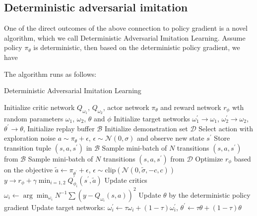 \subsection{Deterministic adversarial imitation}
One of the direct outcomes of the above connection to policy gradient is a novel algorithm, which we call Deterministic Adversarial Imitation Learning. 
Assume policy $\pi_{\theta}$ is deterministic, then based on the deterministic policy gradient, we have

The algorithm runs as follows:

\begin{algorithm}
\caption{Deterministic Adversarial Imitation Learning}
\begin{algorithmic}[1] %
\STATE Initialize critic network $Q_{\omega_1}$, $Q_{\omega_2}$, actor network $\pi_{\theta}$ and reward network $r_{\phi}$ wth random parameters $\omega_1$, $\omega_2$, $\theta$ and $\phi$
\STATE Initialize target networks $\omega_1^\prime\rightarrow\omega_1$, $\omega_2^\prime\rightarrow\omega_2$, $\theta^\prime\rightarrow\theta$,
\STATE Initialize replay buffer $\mathcal{B}$
\STATE Initialize demonstration set $\mathcal{D}$
\STATE Select action with exploration noise $a\sim\pi_{\theta} + \epsilon$, $\epsilon\sim \mathcal{N}(0, \sigma)$ and observe new state $s^\prime$
\STATE Store transition tuple $(s, a, s^\prime)$ in $\mathcal{B}$
\STATE Sample mini-batch of $N$ transitions $(s, a, s^\prime)$ from $\mathcal{B}$
\STATE Sample mini-batch of $N$ transitions $(s, a, s^\prime)$ from $\mathcal{D}$
\STATE Optimize $r_{\phi}$ based on the objective
\ENDIF
\STATE $\tilde{a} \leftarrow \pi_{\theta^\prime}+\epsilon$, $\epsilon\sim \text{clip}(\mathcal{N}(0, \tilde{\sigma}, -c, c))$
\STATE $y\rightarrow r_{\phi}+\gamma \min_{i=1, 2}Q_{\phi_i}^\prime(s^\prime, \tilde{a})$
\STATE Update critics $\omega_i\leftarrow \arg\min_{\omega_i} N^{-1}\sum(y - Q_{\omega_i}(s, a))^2$
\STATE Update $\theta$ by the deterministic policy gradient
\STATE Update target networks: $\omega_i^\prime\leftarrow \tau \omega_i + (1-\tau)\omega_i^\prime$, $\theta^\prime \leftarrow \tau \theta + (1-\tau)\theta $
\ENDIF
\ENDFOR
\end{algorithmic}
\end{algorithm}
